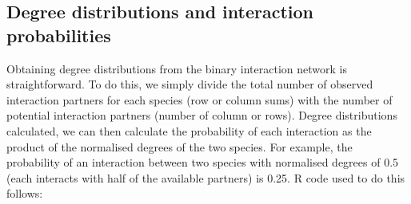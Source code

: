 \documentclass[12pt]{article}
\begin{document}
        



    \subsection*{Degree distributions and interaction probabilities}

      Obtaining degree distributions from the binary interaction 
      network is straightforward. To do this, we simply divide the 
      total number of observed interaction partners for each 
      species (row or column sums) with the number of potential 
      interaction partners (number of column or rows). Degree 
      distributions calculated, we can then calculate the 
      probability of each interaction as the product of the 
      normalised degrees of the two species. For example, the 
      probability of an interaction between two species with 
      normalised degrees of 0.5 (each interacts with half of the 
      available partners) is 0.25. R code used to do this follows:
\end{document}
